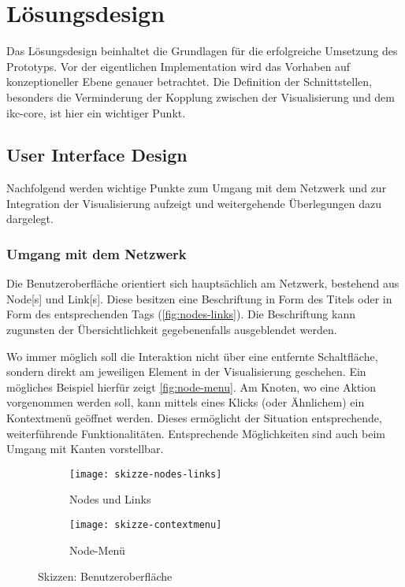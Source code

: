 \chapter{Lösungsdesign}

Das Lösungsdesign beinhaltet die Grundlagen für die erfolgreiche Umsetzung des Prototyps. Vor der eigentlichen Implementation wird das Vorhaben auf konzeptioneller Ebene genauer betrachtet. Die Definition der Schnittstellen, besonders die Verminderung der Kopplung zwischen der Visualisierung und dem \gls{ikc-core}, ist hier ein wichtiger Punkt.



\section{User Interface Design}

Nachfolgend werden wichtige Punkte zum Umgang mit dem \gls{Netzwerk} und zur Integration der Visualisierung aufzeigt und weitergehende Überlegungen dazu dargelegt.

\subsection{Umgang mit dem Netzwerk}

Die Benutzeroberfläche orientiert sich hauptsächlich am \gls{Netzwerk}, bestehend aus \gls{Node}[s] und \gls{Link}[s]. Diese besitzen eine Beschriftung in Form des Titels oder in Form des entsprechenden \gls{Tags} (\autoref{fig:nodes-links}). Die Beschriftung kann zugunsten der Übersichtlichkeit gegebenenfalls ausgeblendet werden.

Wo immer möglich soll die Interaktion nicht über eine entfernte Schaltfläche, sondern direkt am jeweiligen Element in der Visualisierung geschehen. Ein mögliches Beispiel hierfür zeigt \autoref{fig:node-menu}. Am Knoten, wo eine Aktion vorgenommen werden soll, kann mittels eines Klicks (oder Ähnlichem) ein Kontextmenü geöffnet werden. Dieses ermöglicht der Situation entsprechende, weiterführende Funktionalitäten. Entsprechende Möglichkeiten sind auch beim Umgang mit Kanten vorstellbar.

\begin{figure}[htbp]
\centering
 \begin{subfigure}[b]{0.35\textwidth}
        \centering
        \texttt{[image: skizze-nodes-links]}
        \caption{Nodes und Links}
        \label{fig:nodes-links}
    \end{subfigure}
 \begin{subfigure}[b]{0.35\textwidth}
        \centering
        \texttt{[image: skizze-contextmenu]}
        \caption{Node-Menü}
        \label{fig:node-menu}
    \end{subfigure}
    \caption{Skizzen: Benutzeroberfläche}
\end{figure}


